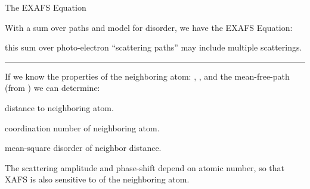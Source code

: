\begin{slide}{The EXAFS Equation}
    
    With a sum over paths and model for disorder, we have the
    EXAFS Equation:
    
    {\large
      \begin{center}
      \end{center}
    }
    
    \vmm \vmm
    this sum over photo-electron ``scattering paths''  may include multiple scatterings.
    
    \vmm \hrule \vmm
    
    If we know the {} properties of the neighboring
    atom: , , and the mean-free-path
     (from {\feff}) we can determine:
   
      
    \vmm
    \begin{cenpage}{80mm}
      \begin{description}  \setlength{\itemindent}{3mm}
      \item[${{\Blue{R}}}$]  distance to neighboring atom.  
      \item[${{\Blue{N}}}$]  coordination number of neighboring atom.
      \item[${{\Blue{\bsigma^2}}}$] mean-square disorder of
      neighbor distance.
      \end{description}
    \end{cenpage}

    \vmm \vmm
  
    The scattering amplitude  and phase-shift 
    depend on atomic number, so that XAFS is also sensitive to
    {} of the neighboring atom.
    
  \vfill
\end{slide} 



